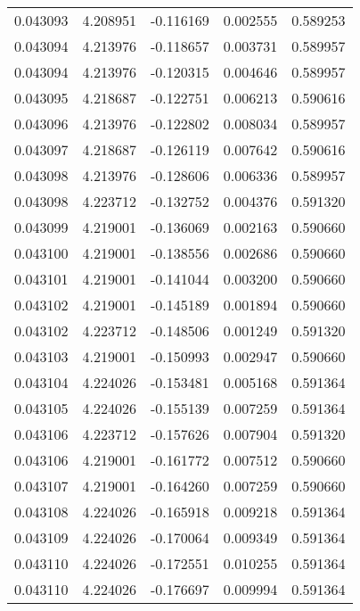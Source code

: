 \begin{tabular}{lrrrr}
0.043093    &  4.208951 & -0.116169 &  0.002555 &             0.589253 \\
0.043094    &  4.213976 & -0.118657 &  0.003731 &             0.589957 \\
0.043094    &  4.213976 & -0.120315 &  0.004646 &             0.589957 \\
0.043095    &  4.218687 & -0.122751 &  0.006213 &             0.590616 \\
0.043096    &  4.213976 & -0.122802 &  0.008034 &             0.589957 \\
0.043097    &  4.218687 & -0.126119 &  0.007642 &             0.590616 \\
0.043098    &  4.213976 & -0.128606 &  0.006336 &             0.589957 \\
0.043098    &  4.223712 & -0.132752 &  0.004376 &             0.591320 \\
0.043099    &  4.219001 & -0.136069 &  0.002163 &             0.590660 \\
0.043100    &  4.219001 & -0.138556 &  0.002686 &             0.590660 \\
0.043101    &  4.219001 & -0.141044 &  0.003200 &             0.590660 \\
0.043102    &  4.219001 & -0.145189 &  0.001894 &             0.590660 \\
0.043102    &  4.223712 & -0.148506 &  0.001249 &             0.591320 \\
0.043103    &  4.219001 & -0.150993 &  0.002947 &             0.590660 \\
0.043104    &  4.224026 & -0.153481 &  0.005168 &             0.591364 \\
0.043105    &  4.224026 & -0.155139 &  0.007259 &             0.591364 \\
0.043106    &  4.223712 & -0.157626 &  0.007904 &             0.591320 \\
0.043106    &  4.219001 & -0.161772 &  0.007512 &             0.590660 \\
0.043107    &  4.219001 & -0.164260 &  0.007259 &             0.590660 \\
0.043108    &  4.224026 & -0.165918 &  0.009218 &             0.591364 \\
0.043109    &  4.224026 & -0.170064 &  0.009349 &             0.591364 \\
0.043110    &  4.224026 & -0.172551 &  0.010255 &             0.591364 \\
0.043110    &  4.224026 & -0.176697 &  0.009994 &             0.591364 \\

\end{tabular}

